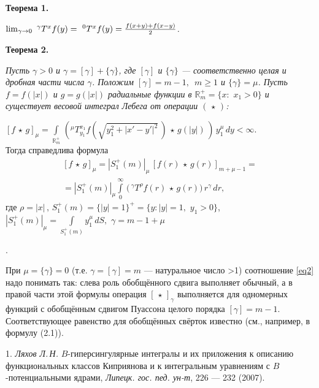 	{\bf Теорема 1.}  {\it $\lim_{\gamma\to0}\,\,^\gamma T^x f(y)=\,\,^0T^x f(y)={f(x+y)+f(x-y)\over2}$.

{\bf Теорема 2.}  {\it    Пусть $\gamma{>}0$ и $\gamma=[\gamma]+\{\gamma\}$, где $[\gamma]$ и $\{\gamma\}$ --- соответственно целая и дробная части числа $\gamma$.
Положим $[\gamma]=m-1, \,\,\,m\geqslant1$ и $\{\gamma\}=\mu$. Пусть $f=f(|x|)$ и
$g=g(|x|)$ радиальные функции в $\mathbb{R}^+_m=\{x:\,\,x_1>0\}$ и существует весовой интеграл Лебега от операции $(\,\star\,)$:

$
[f\,\star\,g]_\mu=\int\limits_{\mathbb{R}^+_m}\,\left(^\mu T^{x_1}_{y_1}f(\sqrt{y_1^2+
|x'-y'|^2}\,)\,\star\,g(|y|)\,\right)\,y_1^\mu\,dy<\infty.
$ \\
Тогда справедлива формула
\begin{multline}\label{eq2}
	[f\,\star\,g]_\mu=|S_1^+(m)|_\mu\, \left[f(r)\,\star\,g(r)\right]_{m+\mu-1} =
	\\=
	|S^+_1(m)|_\mu\int\limits_0^\infty \,\biggl(\,^\gamma T^\rho f(r)\,\star\,g(r)
	\biggl)\,r^\gamma\,dr,
\end{multline}
где  $\rho=|x|\,, \,S^+_1(m){=}\{|y|{=}1\}^+{=}\{y:|y|{=}1,\,\,y_1>0\}$,
$
|S_1^+(m)|_\mu{=}\int\limits_{S_1^+(m)} y_1^\mu\,dS,$  $\gamma{=}m{-}1{+}\mu$}}.

 При $\mu=\{\gamma\}=0$ (т.е. $\gamma=[\gamma]=m$ --- натуральное число >1) соотношение \eqref{eq2} надо понимать так:
 слева роль обобщённого сдвига выполняет обычный,
 а в правой части этой формулы операция $[\,\star\,]_\gamma$
 выполняется для одномерных функций с обобщённым сдвигом Пуассона целого порядка $[\gamma]=m-1$.
 Соответствующее равенство для обобщённых свёрток известно   (см., например,  в \cite{lit-ra3} формулу (2.1)).

\litlist

1. {\it Ляхов Л.\,Н.} $B$-гиперсингулярные интегралы и их приложения к описанию функциональных классов Киприянова и к интегральным уравнениям с $B$-потенциальными ядрами,  {\it Липецк. гос. пед. ун-т}, 226 --- 232 (2007).

